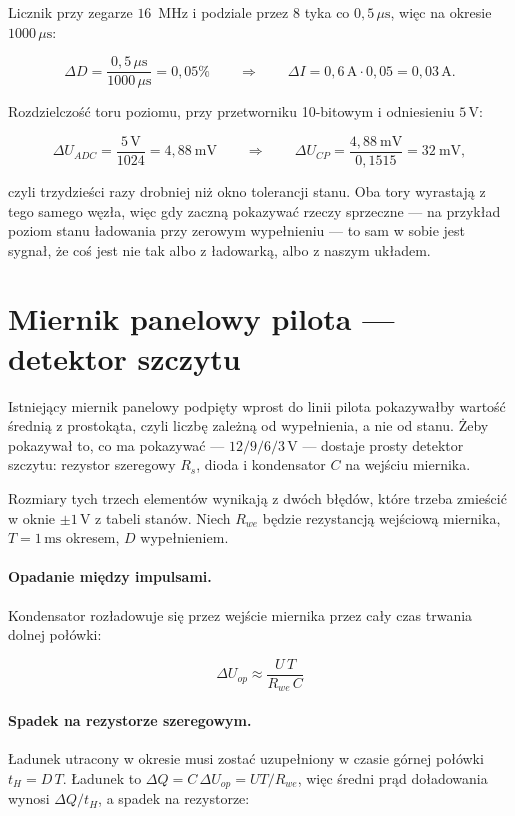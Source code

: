 \documentclass[a4paper,11pt]{article}
\newcommand{\volt}{\,\mathrm{V}}
\newcommand{\amp}{\,\mathrm{A}}
\newcommand{\us}{\,\mu\mathrm{s}}
\newcommand{\ms}{\,\mathrm{ms}}
\begin{document}
Licznik przy zegarze $16$~MHz i podziale przez $8$ tyka co $0{,}5\us$, więc na
okresie $1000\us$:

\[
\Delta D=\frac{0{,}5\us}{1000\us}=0{,}05\%
\qquad\Longrightarrow\qquad
\Delta I = 0{,}6\amp\cdot0{,}05=0{,}03\amp .
\]

Rozdzielczość toru poziomu, przy przetworniku 10-bitowym i odniesieniu $5\volt$:

\[
\Delta U_{ADC}=\frac{5\volt}{1024}=4{,}88\ \mathrm{mV}
\qquad\Longrightarrow\qquad
\Delta U_{CP}=\frac{4{,}88\ \mathrm{mV}}{0{,}1515}=32\ \mathrm{mV},
\]

czyli trzydzieści razy drobniej niż okno tolerancji stanu. Oba tory wyrastają
z tego samego węzła, więc gdy zaczną pokazywać rzeczy sprzeczne --- na przykład
poziom stanu ładowania przy zerowym wypełnieniu --- to sam w sobie jest sygnał,
że coś jest nie tak albo z ładowarką, albo z naszym układem.

\section{Miernik panelowy pilota --- detektor szczytu}
\label{sec:szczyt}

Istniejący miernik panelowy podpięty wprost do linii pilota pokazywałby wartość
średnią z prostokąta, czyli liczbę zależną od wypełnienia, a nie od stanu. Żeby
pokazywał to, co ma pokazywać --- $12/9/6/3\volt$ --- dostaje prosty detektor
szczytu: rezystor szeregowy $R_s$, dioda i kondensator $C$ na wejściu miernika.

Rozmiary tych trzech elementów wynikają z dwóch błędów, które trzeba zmieścić
w oknie $\pm1\volt$ z tabeli stanów. Niech $R_{we}$ będzie rezystancją wejściową
miernika, $T=1\ms$ okresem, $D$ wypełnieniem.

\paragraph{Opadanie między impulsami.} Kondensator rozładowuje się przez wejście
miernika przez cały czas trwania dolnej połówki:

\begin{equation}
\Delta U_{op}\approx\frac{U\,T}{R_{we}\,C}
\label{eq:opadanie}
\end{equation}

\paragraph{Spadek na rezystorze szeregowym.} Ładunek utracony w okresie musi zostać
uzupełniony w czasie górnej połówki $t_H = D\,T$. Ładunek to
$\Delta Q = C\,\Delta U_{op} = U T/R_{we}$, więc średni prąd doładowania wynosi
$\Delta Q/t_H$, a spadek na rezystorze:
\end{document}
